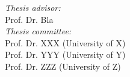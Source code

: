 
\null 
\vfill
\textit{Thesis advisor:}\\
Prof. Dr. Bla\\

\textit{Thesis committee:}\\
Prof. Dr. XXX (University of X)\\
Prof. Dr. YYY (University of Y)\\
Prof. Dr. ZZZ (University of Z)


